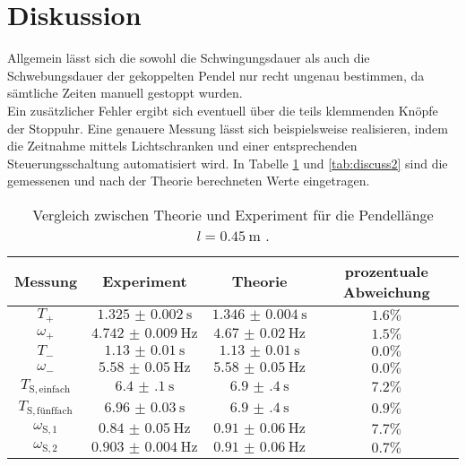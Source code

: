 \section{Diskussion}
\label{sec:Diskussion}
Allgemein lässt sich die sowohl die Schwingungsdauer als auch die Schwebungsdauer der gekoppelten Pendel nur recht ungenau bestimmen, da sämtliche Zeiten manuell gestoppt wurden.\\
Ein zusätzlicher Fehler ergibt sich eventuell über die teils klemmenden Knöpfe der Stoppuhr.
Eine genauere Messung lässt sich beispielsweise realisieren, indem die Zeitnahme mittels Lichtschranken und einer entsprechenden Steuerungsschaltung automatisiert wird.
In Tabelle \ref{tab:discuss} und \ref{tab:discuss2} sind die gemessenen und nach der Theorie
berechneten Werte eingetragen.

\begin{table}
	\caption{Vergleich zwischen Theorie und Experiment für die Pendellänge $l=\SI{0.45}{\meter}$ .}
	\label{tab:discuss}
	\begin{tabular}{cccc}
		\toprule
		Messung                    & Experiment               & Theorie                  & prozentuale Abweichung \\
		\midrule
		$T_{\mathrm{+}}$           & $\SI{1.325(2)}{\second}$ & $\SI{1.346(4)}{\second}$ & $1.6\%$                \\
		$\omega_{\mathrm{+}}$      & $\SI{4.742(9)}{\Hz}$     & $\SI{4.67(2)}{\Hz}$      & $1.5\%$                \\
		$T_{\mathrm{-}}$           & $\SI{1.13(1)}{\second}$  & $\SI{1.13(1)}{\second}$  & $0.0\% $               \\
		$\omega_{\mathrm{-}}$      & $\SI{5.58(5)}{\Hz}$      & $\SI{5.58(5)}{\Hz}$      & $0.0\%$                \\
		$T_{\mathrm{S,einfach}}$   & $\SI{6.4(1)}{\second}$   & $\SI{6.9(4)}{\second}$   & $7.2\%$                \\
		$T_{\mathrm{S,fünffach}}$ & $\SI{6.96(3)}{\second}$  & $\SI{6.9(4)}{\second}$   & $0.9\%$                \\
		$\omega_{\mathrm{S,1}}$    & $\SI{0.84(5)}{\Hz}$      & $\SI{0.91(6)}{\Hz}$      & $7.7\%$                \\
		$\omega_{\mathrm{S,2}}$    & $\SI{0.903(4)}{\Hz}$     & $\SI{0.91(6)}{\Hz}$      & $0.7\%$                \\
		\bottomrule
	\end{tabular}
\end{table}

